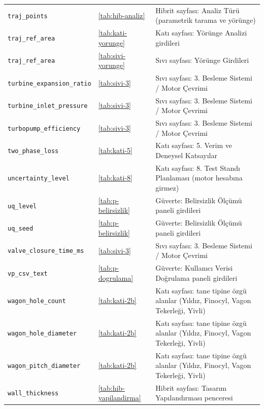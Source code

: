 \documentclass[11pt,a4paper]{article}
\begin{document}
{\begin{longtable}{@{}>{\raggedright\arraybackslash}p{5.2cm}p{1.4cm}>{\raggedright\arraybackslash}p{7.4cm}@{}}
\texttt{traj\_\allowbreak{}points} & \ref{tab:hib-analiz} & Hibrit sayfası: Analiz Türü (parametrik tarama ve yörünge) \\
\texttt{traj\_\allowbreak{}ref\_\allowbreak{}area} & \ref{tab:kati-yorunge} & Katı sayfası: Yörünge Analizi girdileri \\
\texttt{traj\_\allowbreak{}ref\_\allowbreak{}area} & \ref{tab:sivi-yorunge} & Sıvı sayfası: Yörünge Girdileri \\
\texttt{turbine\_\allowbreak{}expansion\_\allowbreak{}ratio} & \ref{tab:sivi-3} & Sıvı sayfası: 3. Besleme Sistemi / Motor Çevrimi \\
\texttt{turbine\_\allowbreak{}inlet\_\allowbreak{}pressure} & \ref{tab:sivi-3} & Sıvı sayfası: 3. Besleme Sistemi / Motor Çevrimi \\
\texttt{turbopump\_\allowbreak{}efficiency} & \ref{tab:sivi-3} & Sıvı sayfası: 3. Besleme Sistemi / Motor Çevrimi \\
\texttt{two\_\allowbreak{}phase\_\allowbreak{}loss} & \ref{tab:kati-5} & Katı sayfası: 5. Verim ve Deneysel Katsayılar \\
\texttt{uncertainty\_\allowbreak{}level} & \ref{tab:kati-8} & Katı sayfası: 8. Test Standı Planlaması (motor hesabına girmez) \\
\texttt{uq\_\allowbreak{}level} & \ref{tab:p-belirsizlik} & Güverte: Belirsizlik Ölçümü paneli girdileri \\
\texttt{uq\_\allowbreak{}seed} & \ref{tab:p-belirsizlik} & Güverte: Belirsizlik Ölçümü paneli girdileri \\
\texttt{valve\_\allowbreak{}closure\_\allowbreak{}time\_\allowbreak{}ms} & \ref{tab:sivi-3} & Sıvı sayfası: 3. Besleme Sistemi / Motor Çevrimi \\
\texttt{vp\_\allowbreak{}csv\_\allowbreak{}text} & \ref{tab:p-dogrulama} & Güverte: Kullanıcı Verisi Doğrulama paneli girdileri \\
\texttt{wagon\_\allowbreak{}hole\_\allowbreak{}count} & \ref{tab:kati-2b} & Katı sayfası: tane tipine özgü alanlar (Yıldız, Finocyl, Vagon Tekerleği, Yivli) \\
\texttt{wagon\_\allowbreak{}hole\_\allowbreak{}diameter} & \ref{tab:kati-2b} & Katı sayfası: tane tipine özgü alanlar (Yıldız, Finocyl, Vagon Tekerleği, Yivli) \\
\texttt{wagon\_\allowbreak{}pitch\_\allowbreak{}diameter} & \ref{tab:kati-2b} & Katı sayfası: tane tipine özgü alanlar (Yıldız, Finocyl, Vagon Tekerleği, Yivli) \\
\texttt{wall\_\allowbreak{}thickness} & \ref{tab:hib-yapilandirma} & Hibrit sayfası: Tasarım Yapılandırması penceresi \\

\end{longtable}}
\end{document}
